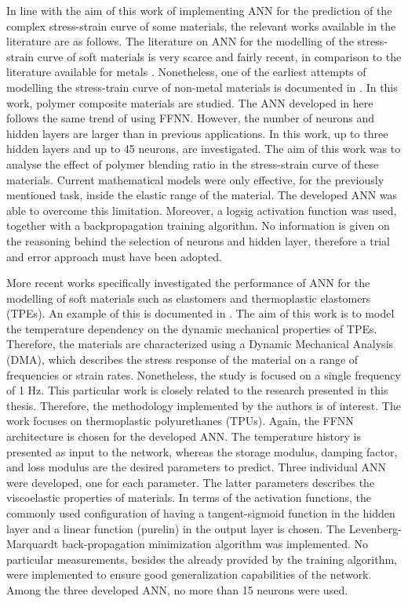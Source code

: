 In line with the aim of this work of implementing ANN for the prediction of the complex stress-strain curve of some materials, the relevant works available in the literature are as follows. The literature on ANN for the modelling of the stress-strain curve of soft materials is very scarce and fairly recent, in comparison to the literature available for metals \cite{ altinkok2005use,setti2014artificial, jenik2017sequential}. Nonetheless, one of the earliest attempts of modelling the stress-train curve of non-metal materials is documented in \cite{yousef2011prediction}. In this work, polymer composite materials are studied. The ANN developed in here follows the same trend of using FFNN. However, the number of neurons and hidden layers are larger than in previous applications. In this work, up to three hidden layers and up to 45 neurons, are investigated. The aim of this work was to analyse the effect of polymer blending ratio in the stress-strain curve of these materials. Current mathematical models were only effective, for the previously mentioned task, inside the elastic range of the material. The developed ANN was able to overcome this limitation. Moreover, a logsig activation function was used, together with a backpropagation training algorithm. No information is given on the reasoning behind the selection of neurons and hidden layer, therefore a trial and error approach must have been adopted. 

More recent works specifically investigated the performance of ANN for the modelling of soft materials such as elastomers and thermoplastic elastomers (TPEs). An example of this is documented in \cite{kopal2017modeling}. The aim of this work is to model the temperature dependency on the dynamic mechanical properties of TPEs. Therefore, the materials are characterized using a Dynamic Mechanical Analysis (DMA), which describes the stress response of the material on a range of frequencies or strain rates. Nonetheless, the study is focused on a single frequency of 1 Hz. This particular work is closely related to the research presented in this thesis. Therefore, the methodology implemented by the authors is of interest. The work focuses on thermoplastic polyurethanes (TPUs). Again, the FFNN architecture is chosen for the developed ANN. The temperature history is presented as input to the network, whereas the storage modulus, damping factor, and loss modulus are the desired parameters to predict. Three individual ANN were developed, one for each parameter. The latter parameters describes the viscoelastic properties of materials. In terms of the activation functions, the commonly used configuration of having a tangent-sigmoid function in the hidden layer and a linear function (purelin) in the output layer is chosen. The Levenberg-Marquardt back-propagation minimization algorithm was implemented. No particular measurements, besides the already provided by the training algorithm, were implemented to ensure good generalization capabilities of the network. Among the three developed ANN, no more than 15 neurons were used.

